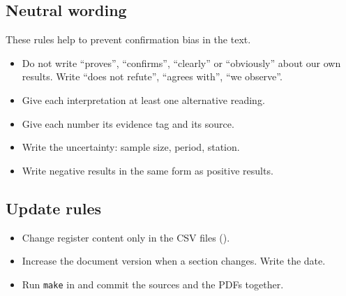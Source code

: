 \documentclass[11pt]{article}
\begin{document}
\subsection{Neutral wording}
These rules help to prevent confirmation bias in the text.
\begin{itemize}
  \item Do not write ``proves'', ``confirms'', ``clearly'' or ``obviously'' about our own results. Write ``does not refute'', ``agrees with'', ``we observe''.
  \item Give each interpretation at least one alternative reading.
  \item Give each number its evidence tag and its source.
  \item Write the uncertainty: sample size, period, station.
  \item Write negative results in the same form as positive results.
\end{itemize}

\subsection{Update rules}
\begin{itemize}
  \item Change register content only in the CSV files ().
  \item Increase the document version when a section changes. Write the date.
  \item Run \texttt{make} in  and commit the sources and the PDFs together.
\end{itemize}

\clearpage

\end{document}
